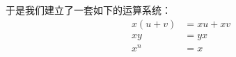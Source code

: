         于是我们建立了一套如下的运算系统：
        \begin{align}
            x(u + v) &= xu + xv \label{eqn:Calculations/BooleanAlgebra/OriginAndBuilding/DistributiveLaw} \\
            xy &= yx \label{eqn:Calculations/BooleanAlgebra/OriginAndBuilding/CommutativeLaw} \\
            x ^ n &= x \label{eqn:Calculations/BooleanAlgebra/OriginAndBuilding/IndexLaw}
        \end{align}
